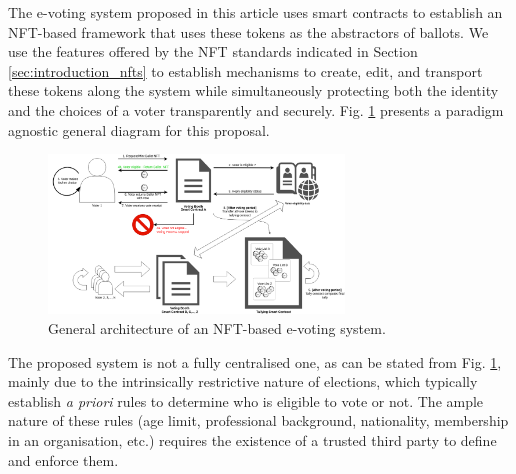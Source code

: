 \documentclass[../main.tex]{subfiles}
\begin{document}
The e-voting system proposed in this article uses smart contracts to establish an NFT-based framework that uses these tokens as the abstractors of ballots. We use the features offered by the NFT standards indicated in Section \ref{sec:introduction_nfts} to establish mechanisms to create, edit, and transport these tokens along the system while simultaneously protecting both the identity and the choices of a voter transparently and securely. Fig. \ref{fig:general_architecture} presents a paradigm agnostic general diagram for this proposal.

\begin{figure}[htp]
    \centering
    \includegraphics[width=0.7\textwidth]{../Images/01_general_solution.png}
    \caption{General architecture of an NFT-based e-voting system.}
    \label{fig:general_architecture}
\end{figure}

The proposed system is not a fully centralised one, as can be stated from Fig. \ref{fig:general_architecture}, mainly due to the intrinsically restrictive nature of elections, which typically establish \textit{a priori} rules to determine who is eligible to vote or not. The ample nature of these rules (age limit, professional background, nationality, membership in an organisation, etc.) requires the existence of a trusted third party to define and enforce them.
\end{document}

